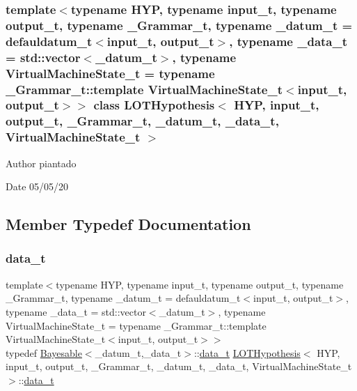 \subsubsection*{template$<$typename H\+YP, typename input\+\_\+t, typename output\+\_\+t, typename \+\_\+\+Grammar\+\_\+t, typename \+\_\+datum\+\_\+t = defauldatum\+\_\+t$<$input\+\_\+t, output\+\_\+t$>$, typename \+\_\+data\+\_\+t = std\+::vector$<$\+\_\+datum\+\_\+t$>$, typename Virtual\+Machine\+State\+\_\+t = typename \+\_\+\+Grammar\+\_\+t\+::template Virtual\+Machine\+State\+\_\+t$<$input\+\_\+t, output\+\_\+t$>$$>$\newline
class L\+O\+T\+Hypothesis$<$ H\+Y\+P, input\+\_\+t, output\+\_\+t, \+\_\+\+Grammar\+\_\+t, \+\_\+datum\+\_\+t, \+\_\+data\+\_\+t, Virtual\+Machine\+State\+\_\+t $>$}

\begin{DoxyAuthor}{Author}
piantado 
\end{DoxyAuthor}
\begin{DoxyDate}{Date}
05/05/20 
\end{DoxyDate}


\subsection{Member Typedef Documentation}
\mbox{\label{class_l_o_t_hypothesis_abd9c848100dfaaf2870f5dfa9ea91c65}} 
\subsubsection{\texorpdfstring{data\+\_\+t}{data\_t}}
{\footnotesize\ttfamily template$<$typename H\+YP, typename input\+\_\+t, typename output\+\_\+t, typename \+\_\+\+Grammar\+\_\+t, typename \+\_\+datum\+\_\+t = defauldatum\+\_\+t$<$input\+\_\+t, output\+\_\+t$>$, typename \+\_\+data\+\_\+t = std\+::vector$<$\+\_\+datum\+\_\+t$>$, typename Virtual\+Machine\+State\+\_\+t = typename \+\_\+\+Grammar\+\_\+t\+::template Virtual\+Machine\+State\+\_\+t$<$input\+\_\+t, output\+\_\+t$>$$>$ \\
typedef \hyperlink{class_bayesable}{Bayesable}$<$\+\_\+datum\+\_\+t,\+\_\+data\+\_\+t$>$\+::\hyperlink{class_l_o_t_hypothesis_abd9c848100dfaaf2870f5dfa9ea91c65}{data\+\_\+t} \hyperlink{class_l_o_t_hypothesis}{L\+O\+T\+Hypothesis}$<$ H\+YP, input\+\_\+t, output\+\_\+t, \+\_\+\+Grammar\+\_\+t, \+\_\+datum\+\_\+t, \+\_\+data\+\_\+t, Virtual\+Machine\+State\+\_\+t $>$\+::\hyperlink{class_l_o_t_hypothesis_abd9c848100dfaaf2870f5dfa9ea91c65}{data\+\_\+t}}

